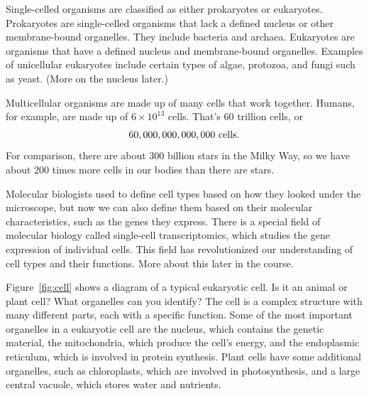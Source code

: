 Single-celled organisms 
are classified as either prokaryotes or eukaryotes. Prokaryotes are single-celled organisms that lack a defined nucleus or other membrane-bound organelles. They include bacteria and archaea. Eukaryotes are organisms that have a defined nucleus and membrane-bound organelles. Examples of unicellular eukaryotes include certain types of algae, protozoa, and fungi such as yeast. (More on the nucleus later.)

Multicellular organisms are made up of many cells that work together. Humans, for example, are made up of \(6 \times 10^{13}\) cells. That's 60 trillion cells, or
$$ 60,000,000,000,000 {\ \rm cells}. $$
For comparison, there are about 300 billion stars in the Milky Way, so we have about 200 times more cells in our bodies than there are stars.

Molecular biologists used to define cell types based on how they looked under the microscope, but now we can also define them based on their molecular characteristics, such as the genes they express. There is a special field of molecular biology called single-cell transcriptomics, 
which studies the gene expression of individual cells. This field has revolutionized our understanding of cell types and their functions. More about this later in the course.

Figure~\ref{fig:cell} shows a diagram of a typical eukaryotic cell. Is it an animal or plant cell? What organelles can you identify? The cell is a complex structure with many different parts, each with a specific function. Some of the most important organelles in a eukaryotic cell are the nucleus, which contains the genetic material, the mitochondria, which produce the cell's energy, and the endoplasmic reticulum, which is involved in protein synthesis. Plant cells have some additional organelles, such as chloroplasts, which are involved in photosynthesis, and a large central vacuole, which stores water and nutrients.

